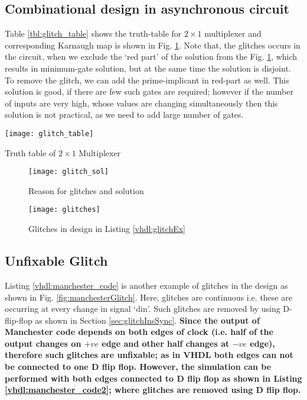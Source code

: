 \subsection{Combinational design in asynchronous circuit}
Table \ref{tbl:glitch_table} shows the truth-table for $2 \times 1$ multiplexer and corresponding Karnaugh map is shown in Fig. \ref{fig:glitch_sol}. Note that, the glitches occurs in the circuit, when we exclude the `red part' of the solution from the Fig. \ref{fig:glitch_sol}, which results in minimum-gate solution, but at the same time the solution is disjoint. To remove the glitch, we can add the prime-implicant in red-part as well. This solution is good, if there are few such gates are required; however if the number of inputs are very high, whose values are changing simultaneously then this solution is not practical, as we need to add large number of gates.

\begin{table}[!h]
	\centering
	\texttt{[image: glitch\_table]}
	\caption{Truth table of $2 \times 1$ Multiplexer}
	\label{tbl:glitch_table}
\end{table}

\begin{figure}[!h]
	\centering
	\texttt{[image: glitch\_sol]}
	\caption{Reason for glitches and solution}
	\label{fig:glitch_sol}
\end{figure}

\begin{figure}[!h]
	\centering
	\texttt{[image: glitches]}
	\caption{Glitches in design in Listing \ref{vhdl:glitchEx}}
	\label{fig:glitches}
\end{figure}



\subsection{Unfixable Glitch}
Listing \ref{vhdl:manchester_code} is another example of glitches in the design as shown in Fig. \ref{fig:manchesterGlitch}. Here, glitches are continuous i.e. these are occurring at every change in signal `din'. Such glitches are removed by using D-flip-flop as shown in Section \ref{sec:glitchInsSync}. \textbf{Since the output of Manchester code depends on both edges of clock (i.e. half of the output changes on $+ve$ edge and other half changes at $-ve$ edge), therefore such glitches are unfixable; as in VHDL both edges can not be connected to one D flip flop. However, the simulation can be performed with both edges connected to D flip flop as shown in Listing \ref{vhdl:manchester_code2}; where glitches are removed using D flip flop.}

